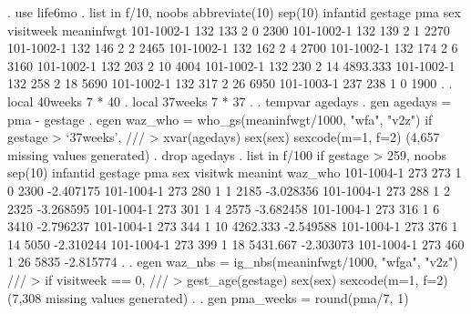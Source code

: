. use life6mo
{\smallskip}
. list in f/10, noobs abbreviate(10) sep(10)
{\smallskip}
  {\TLC}
  {\VBAR}   infantid   gestage   pma   sex   visitweek   meaninfwgt {\VBAR}
  {\LFTT}
  {\VBAR} 101-1002-1       132   133     2           0         2300 {\VBAR}
  {\VBAR} 101-1002-1       132   139     2           1         2270 {\VBAR}
  {\VBAR} 101-1002-1       132   146     2           2         2465 {\VBAR}
  {\VBAR} 101-1002-1       132   162     2           4         2700 {\VBAR}
  {\VBAR} 101-1002-1       132   174     2           6         3160 {\VBAR}
  {\VBAR} 101-1002-1       132   203     2          10         4004 {\VBAR}
  {\VBAR} 101-1002-1       132   230     2          14     4893.333 {\VBAR}
  {\VBAR} 101-1002-1       132   258     2          18         5690 {\VBAR}
  {\VBAR} 101-1002-1       132   317     2          26         6950 {\VBAR}
  {\VBAR} 101-1003-1       237   238     1           0         1900 {\VBAR}
  {\BLC}
{\smallskip}
. 
. local 40weeks 7 * 40
{\smallskip}
. local 37weeks 7 * 37 
{\smallskip}
. 
. tempvar agedays
{\smallskip}
. gen agedays = pma - gestage
{\smallskip}
. egen waz_who = who_gs(meaninfwgt/1000, "wfa", "v2z") if gestage > `37weeks', ///
>         xvar(agedays) sex(sex) sexcode(m=1, f=2)
(4,657 missing values generated)
{\smallskip}
. drop agedays
{\smallskip}
. list in f/100 if gestage > 259, noobs sep(10)
{\smallskip}
  {\TLC}
  {\VBAR}   infantid   gestage   pma   sex   visitw{\tytilde}k   meanin{\tytilde}t     waz_who {\VBAR}
  {\LFTT}
  {\VBAR} 101-1004-1       273   273     1          0       2300   -2.407175 {\VBAR}
  {\VBAR} 101-1004-1       273   280     1          1       2185   -3.028356 {\VBAR}
  {\VBAR} 101-1004-1       273   288     1          2       2325   -3.268595 {\VBAR}
  {\VBAR} 101-1004-1       273   301     1          4       2575   -3.682458 {\VBAR}
  {\VBAR} 101-1004-1       273   316     1          6       3410   -2.796237 {\VBAR}
  {\VBAR} 101-1004-1       273   344     1         10   4262.333   -2.549588 {\VBAR}
  {\VBAR} 101-1004-1       273   376     1         14       5050   -2.310244 {\VBAR}
  {\VBAR} 101-1004-1       273   399     1         18   5431.667   -2.303073 {\VBAR}
  {\VBAR} 101-1004-1       273   460     1         26       5835   -2.815774 {\VBAR}
  {\BLC}
{\smallskip}
. 
. egen waz_nbs = ig_nbs(meaninfwgt/1000, "wfga", "v2z") ///
>         if visitweek == 0, ///
>         gest_age(gestage) sex(sex) sexcode(m=1, f=2)
(7,308 missing values generated)
{\smallskip}
. 
. gen pma_weeks = round(pma/7, 1)
